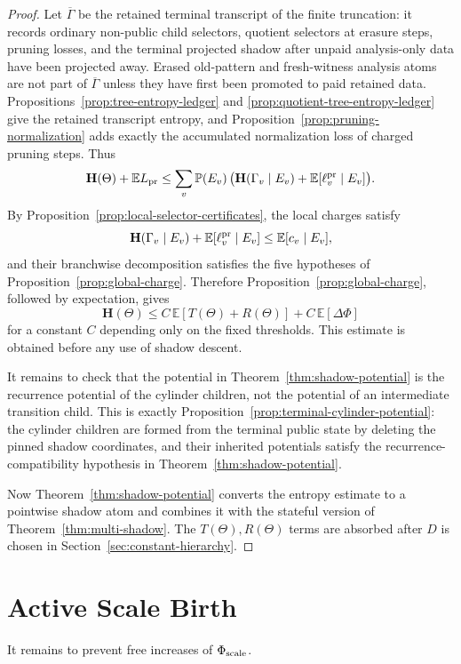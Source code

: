 \documentclass[11pt]{article}
\newcommand{\Prb}{\mathbb P}
\newcommand{\EE}{\mathbb E}
\newcommand{\bfH}{\mathbf H}
\begin{document}
\begin{proof}
Let $\overline\Gamma$ be the retained terminal transcript of the finite
truncation: it records ordinary non-public child selectors, quotient selectors
at erasure steps, pruning losses, and the terminal projected shadow after
unpaid analysis-only data have been projected away.  Erased old-pattern and
fresh-witness analysis atoms are not part of $\overline\Gamma$ unless they have
first been promoted to paid retained data.  Propositions~\ref{prop:tree-entropy-ledger}
and \ref{prop:quotient-tree-entropy-ledger}
give the retained transcript entropy, and
Proposition~\ref{prop:pruning-normalization} adds exactly the accumulated
normalization loss of charged pruning steps.  Thus
\[
  \bfH(\Theta)+\EE L_{\rm pr}
  \le
  \sum_v \Prb(E_v)\,
  \bigl(\bfH(\Gamma_v\mid E_v)+\EE[\ell_v^{\rm pr}\mid E_v]\bigr).
\]
By Proposition~\ref{prop:local-selector-certificates}, the local charges
satisfy
\[
  \bfH(\Gamma_v\mid E_v)+\EE[\ell_v^{\rm pr}\mid E_v]\le \EE[c_v\mid E_v],
\]
and their branchwise decomposition satisfies the five hypotheses of
Proposition~\ref{prop:global-charge}.  Therefore
Proposition~\ref{prop:global-charge}, followed by expectation, gives
\[
  \bfH(\Theta)
  \le
  C\,\EE[T(\Theta)+R(\Theta)]
  + C\,\EE[\Delta\Phi]
\]
for a constant $C$ depending only on the fixed thresholds.  This estimate is
obtained before any use of shadow descent.

It remains to check that the potential in Theorem~\ref{thm:shadow-potential}
is the recurrence potential of the cylinder children, not the potential of an
intermediate transition child.  This is exactly
Proposition~\ref{prop:terminal-cylinder-potential}: the cylinder children are
formed from the terminal public state by deleting the pinned shadow
coordinates, and their inherited potentials satisfy the
recurrence-compatibility hypothesis in Theorem~\ref{thm:shadow-potential}.

Now Theorem~\ref{thm:shadow-potential} converts the entropy estimate to a
pointwise shadow atom and combines it with the stateful version of
Theorem~\ref{thm:multi-shadow}.  The $T(\Theta),R(\Theta)$ terms are absorbed
after $D$ is chosen in Section~\ref{sec:constant-hierarchy}.
\end{proof}

\section{Active Scale Birth}

It remains to prevent free increases of $\Phi_{\rm scale}$.
\end{document}
